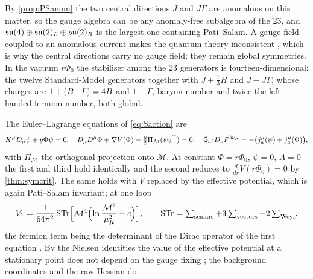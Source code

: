 By \cref{prop:PSanom} the two central directions $J$ and $J\Gamma$ are anomalous on this matter, so the gauge algebra can be any anomaly-free
subalgebra of the $23$, and $\mathfrak{su}(4)\oplus\mathfrak{su}(2)_L\oplus\mathfrak{su}(2)_R$ is the largest one containing Pati--Salam. A gauge field coupled to an anomalous current
makes the quantum theory inconsistent \cite{GrossJackiw72,BouchiatIliopoulosMeyer72}, which is why the central directions carry no gauge
field; they remain global symmetries. In the vacuum $r\Phi_0$ the stabiliser among the $23$ generators is fourteen-dimensional: the twelve
Standard-Model generators together with $J+\tfrac13H$ and $J-J\Gamma$, whose charges are $1+(B\!-\!L)=4B$ and $1-\Gamma$, baryon number and twice
the left-handed fermion number, both global.

\begin{proposition}
\label{prop:coupled3}
The Euler--Lagrange equations of \eqref{eq:Saction} are
\[
K^\mu D_\mu\psi+y\Phi\psi=0,\quad D_\mu D^\mu\Phi+\nabla V(\Phi)-\tfrac y2\Pi_\mathcal M(\psi\psi^{\!\top})=0,\quad \mathsf G_{ab}D_\nu F^{b\nu\mu}=-\bigl(j^\mu_a(\psi)+j^\mu_a(\Phi)\bigr),
\]
with $\Pi_\mathcal M$ the orthogonal projection onto $\mathcal M$. At constant $\Phi=r\Phi_0$, $\psi=0$, $A=0$ the first and third hold identically and the second
reduces to $\tfrac{d}{dr}V(r\Phi_0)=0$ by \cref{thm:symcrit}. The same holds with $V$ replaced by the effective potential, which is again
Pati--Salam invariant; at one loop
\begin{equation}
\label{eq:V1}
V_1=\frac1{64\pi^2}\,\mathrm{STr}\Bigl[\mathcal M^4\Bigl(\ln\frac{\mathcal M^2}{\mu_R^2}-c\Bigr)\Bigr],\qquad
\mathrm{STr}=\textstyle\sum_{\rm scalars}+3\sum_{\rm vectors}-2\sum_{\rm Weyl},
\end{equation}
the fermion term being the determinant of the Dirac operator of the first equation \cite{ColemanWeinberg73,Jackiw74}. By the Nielsen identities the
value of the effective potential at a stationary point does not depend on the gauge fixing \cite{Nielsen75}; the background coordinates and the raw
Hessian do.
\end{proposition}

